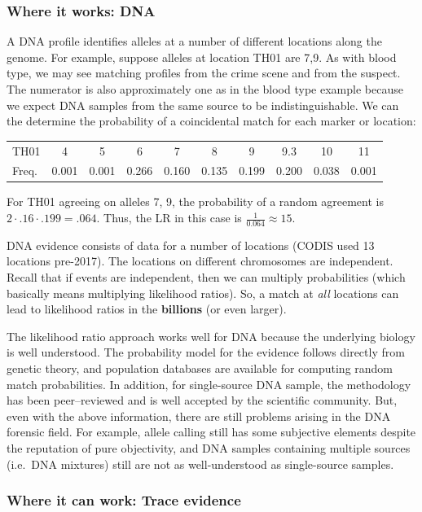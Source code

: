 \documentclass[]{book}
\theoremstyle{definition}
\theoremstyle{definition}
\theoremstyle{remark}
\begin{document}
\subsubsection{Where it works: DNA}\label{where-it-works-dna}

A DNA profile identifies alleles at a number of different locations
along the genome. For example, suppose alleles at location TH01 are 7,9.
As with blood type, we may see matching profiles from the crime scene
and from the suspect. The numerator is also approximately one as in the
blood type example because we expect DNA samples from the same source to
be indistinguishable. We can the determine the probability of a
coincidental match for each marker or location:

\begin{tabular}{lccccccccc}
TH01 & 4 & 5 & 6 & 7 & 8 & 9 & 9.3 & 10 & 11 \\ 
Freq. & 0.001 & 0.001 & 0.266 & 0.160 & 0.135 & 0.199 & 0.200  & 0.038 & 0.001
\end{tabular}

For TH01 agreeing on alleles 7, 9, the probability of a random agreement
is \(2\cdot .16\cdot .199 = .064\). Thus, the LR in this case is
\(\frac{1}{0.064} \approx 15\).

DNA evidence consists of data for a number of locations (CODIS used 13
locations pre-2017). The locations on different chromosomes are
independent. Recall that if events are independent, then we can multiply
probabilities (which basically means multiplying likelihood ratios). So,
a match at \emph{all} locations can lead to likelihood ratios in the
\textbf{billions} (or even larger).

The likelihood ratio approach works well for DNA because the underlying
biology is well understood. The probability model for the evidence
follows directly from genetic theory, and population databases are
available for computing random match probabilities. In addition, for
single-source DNA sample, the methodology has been peer--reviewed and is
well accepted by the scientific community. But, even with the above
information, there are still problems arising in the DNA forensic field.
For example, allele calling still has some subjective elements despite
the reputation of pure objectivity, and DNA samples containing multiple
sources (i.e.~DNA mixtures) still are not as well-understood as
single-source samples.

\subsubsection{Where it can work: Trace
evidence}\label{where-it-can-work-trace-evidence}
\end{document}
